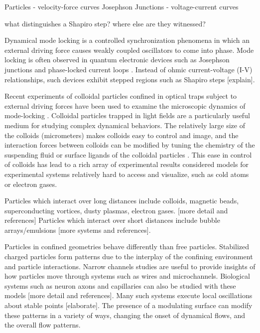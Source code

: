 \documentclass[twocolumn,preprintnumbers,amsmath,amssymb,aps,prx]{revtex4}
\begin{document}
Particles - velocity-force curves
Josephson Junctions - voltage-current curves

what distinguishes a Shapiro step?
where else are they witnessed?

Dynamical mode locking is a controlled 
synchronization phenomena in 
which an external driving force
causes
weakly coupled oscillators to come into phase.
Mode locking is often observed in quantum electronic
devices such as Josephson junctions \cite{}
and phase-locked current loops \cite{}.
Instead of ohmic current-voltage (I-V) relationships,
such devices exhibit stepped regions
such as Shapiro steps \cite{} [explain].

Recent experiments of colloidal particles confined
in optical traps
subject to external driving forces 
have
been used to examine the microscopic dynamics
of mode-locking \cite{juniper2015}.
Colloidal particles trapped in light fields are %
a particularly useful medium for studying complex dynamical behaviors.  %
The relatively large size of the colloids (micrometers)
makes colloids easy to control and image,
and the interaction forces between colloids can be modified
by tuning the chemistry of the suspending fluid or surface ligands
of the colloidal particles \cite{Grier2003}.
This ease in control of colloids has lead to a rich array of 
experimental results  
considered models
for experimental systems relatively hard to access and visualize,
such as cold atoms or electron gases. %

Particles which interact over long distances
include colloids, magnetic beads, superconducting vortices, dusty plasmas, electron gases. [more detail and references]
Particles which interact over short distances include
bubble arrays/emulsions [more systems and references].

Particles in confined geometries behave differently than free particles.
Stabilized charged particles form patterns
due to the interplay of the confining environment
and particle interactions.
Narrow channels studies are useful to provide insights 
of how particles move through systems 
such as wires and microchannels.
Biological systems such as
neuron axons and capillaries can also be studied
with these models [more detail and references].
Many such systems execute local oscillations
about stable points [elaborate].
The presence of a modulating surface
can modify these patterns in a variety of ways,
changing the onset of dynamical flows,
and the overall flow patterns.
%
\end{document}
